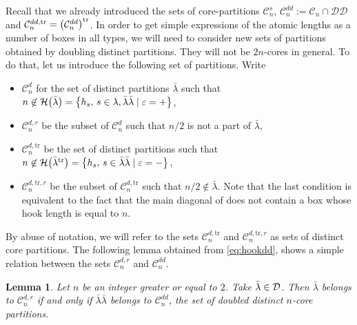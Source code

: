 \documentclass[pdftex]{sigma}
\newtheorem{Lemma}[Theorem]{Lemma}
\numberwithin{equation}{section}
\newcommand{\cC}{\mathcal{C}}
\def\cch{\mathcal H}
\def\ccdd{\mathcal {DD}}
\def\ccd{\mathcal {D}}
\begin{document}
Recall that we already introduced the sets of core-partitions $\cC_{n}^{s}$,
$\cC_{n}^{dd}:=\cC_{n}\cap \ccdd$ and $\smash{\cC_{n}^{dd,\mathrm{tr}}}=\smash{\bigl(\cC_{n}^{dd}\bigr) ^{\mathrm{tr}}}$.
In order to get simple expressions of the
atomic lengths as a number of boxes in all types, we will need to consider
new sets of partitions obtained by doubling distinct partitions. They will
not be $2n$-cores in general. To do that, let us introduce the following set
of partitions. Write
\begin{itemize}\itemsep=0pt
	\item $\cC_{n}^{d}$ for the set of distinct partitions $\bar{\lambda}$ such
	that $n\not\in \cch\bigl(\bar{\lambda}\bigr)=\bigl\{h_{s},\, s\in \lambda ,\bar{\lambda}\bar{%
		\lambda}\mid \varepsilon =+\bigr\}$,
	
	\item $\cC_{n}^{d,r}$ be the subset of $\cC_{n}^{d}$ such that $n/2$ is not
	a part of $\bar{\lambda}$,
	
	\item $\cC_{n}^{d,\mathrm{tr}}$ be the set of distinct partitions such that $%
	n\not\in \cch\bigl(\bar{\lambda}^{\mathrm{tr}}\bigr)=\bigl\{h_{s},\, s\in \bar{\lambda}\bar{%
		\lambda}\mid \varepsilon =-\bigr\}$,
	
	\item $\cC_{n}^{d,\mathrm{tr},r}$ be the subset of $\cC_{n}^{d,\mathrm{tr}}$
	such that $n/2\not\in \bar{\lambda}$. Note that the last condition is equivalent to the fact that the main diagonal of  does not contain a box whose hook length is equal to $n$.
\end{itemize}

By abuse of notation, we will refer to the sets $\cC_{n}^{d,\mathrm{tr}}$
and $\cC_{n}^{d,\mathrm{tr},r}$ as sets of distinct core partitions.
The following lemma obtained from \eqref{eq:hookdd}, shows a simple relation between the sets $%
\cC_{n}^{d,r}$ and $\cC_{n}^{dd}$.

\begin{Lemma}
	\label{lem:dd} Let $n$ be an integer greater or equal to $2$. Take $\bar{%
		\lambda}\in\ccd$. Then $\bar{\lambda}$ belongs to $\cC_{n}^{d,r}$ if and
	only if $\bar{\lambda}\bar{\lambda}$ belongs to $\cC_{n}^{dd}$, the set of
	doubled distinct $n$-core partitions.
\end{Lemma}
\end{document}
